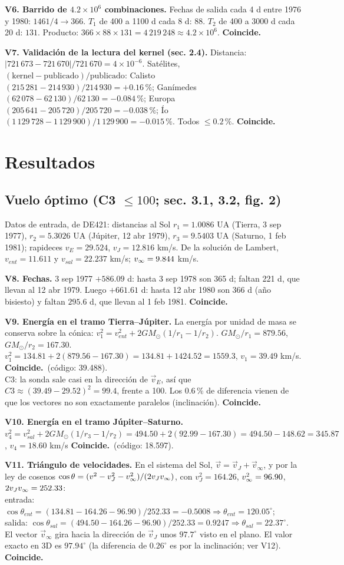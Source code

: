 \documentclass[11pt,letterpaper]{article}
\newcommand{\ok}{\textbf{Coincide.}\ }
\begin{document}
\textbf{V6. Barrido de $4.2\times10^6$ combinaciones.} Fechas de salida cada 4 d entre 1976 y 1980: $1461/4\to366$. $T_1$ de 400 a 1100 d cada 8 d: $88$. $T_2$ de 400 a 3000 d cada 20 d: $131$. Producto: $366\times88\times131=4\,219\,248\approx4.2\times10^6$. \ok

\textbf{V7. Validación de la lectura del kernel (sec. 2.4).} Distancia: $|721\,673-721\,670|/721\,670=4\times10^{-6}$. Satélites, $(\text{kernel}-\text{publicado})/\text{publicado}$: Calisto $(215\,281-214\,930)/214\,930=+0.16\,\%$; Ganímedes $(62\,078-62\,130)/62\,130=-0.084\,\%$; Europa $(205\,641-205\,720)/205\,720=-0.038\,\%$; Ío $(1\,129\,728-1\,129\,900)/1\,129\,900=-0.015\,\%$. Todos $\le0.2\,\%$. \ok

\section{Resultados}
\subsection*{Vuelo óptimo (C3 $\le100$; sec. 3.1, 3.2, fig. 2)}
Datos de entrada, de DE421: distancias al Sol $r_1=1.0086$ UA (Tierra, 3 sep 1977), $r_2=5.3026$ UA (Júpiter, 12 abr 1979), $r_3=9.5403$ UA (Saturno, 1 feb 1981); rapideces $v_E=29.524$, $v_J=12.816$ km/s. De la solución de Lambert, $v_{ent}=11.611$ y $v_{sal}=22.237$ km/s; $v_\infty=9.844$ km/s.

\textbf{V8. Fechas.} 3 sep 1977 $+586.09$ d: hasta 3 sep 1978 son 365 d; faltan 221 d, que llevan al 12 abr 1979. Luego $+661.61$ d: hasta 12 abr 1980 son 366 d (año bisiesto) y faltan $295.6$ d, que llevan al 1 feb 1981. \ok

\textbf{V9. Energía en el tramo Tierra--Júpiter.} La energía por unidad de masa se conserva sobre la cónica: $v_1^2=v_{ent}^2+2GM_\odot(1/r_1-1/r_2)$. $GM_\odot/r_1=879.56$, $GM_\odot/r_2=167.30$. $v_1^2=134.81+2(879.56-167.30)=134.81+1424.52=1559.3$, $v_1=39.49$ km/s. \ok (código: 39.488).\\
C3: la sonda sale casi en la dirección de $\vec v_E$, así que $C3\approx(39.49-29.52)^2=99.4$, frente a 100. Los $0.6\,\%$ de diferencia vienen de que los vectores no son exactamente paralelos (inclinación). \ok

\textbf{V10. Energía en el tramo Júpiter--Saturno.} $v_4^2=v_{sal}^2+2GM_\odot(1/r_3-1/r_2)=494.50+2(92.99-167.30)=494.50-148.62=345.87$, $v_4=18.60$ km/s \ok (código: 18.597).

\textbf{V11. Triángulo de velocidades.} En el sistema del Sol, $\vec v=\vec v_J+\vec v_\infty$, y por la ley de cosenos $\cos\theta=(v^2-v_J^2-v_\infty^2)/(2v_Jv_\infty)$, con $v_J^2=164.26$, $v_\infty^2=96.90$, $2v_Jv_\infty=252.33$:\\
entrada: $\cos\theta_{ent}=(134.81-164.26-96.90)/252.33=-0.5008\Rightarrow\theta_{ent}=120.05^\circ$;\\
salida: $\cos\theta_{sal}=(494.50-164.26-96.90)/252.33=0.9247\Rightarrow\theta_{sal}=22.37^\circ$.\\
El vector $\vec v_\infty$ gira hacia la dirección de $\vec v_J$ unos $97.7^\circ$ visto en el plano. El valor exacto en 3D es $97.94^\circ$ (la diferencia de $0.26^\circ$ es por la inclinación; ver V12). \ok
\end{document}
